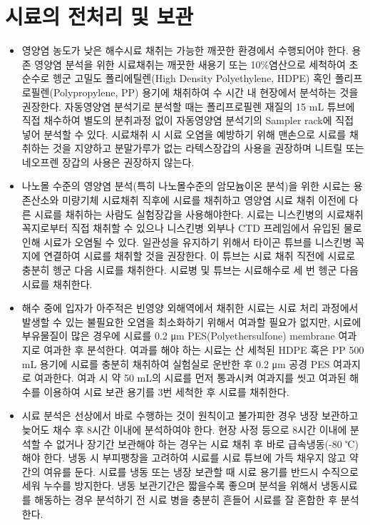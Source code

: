 \documentclass[
]{book}
\providecommand{\tightlist}{%
  \setlength{\itemsep}{0pt}\setlength{\parskip}{0pt}}
\begin{document}
\hypertarget{uxc2dcuxb8ccuxc758-uxc804uxcc98uxb9ac-uxbc0f-uxbcf4uxad00}{%
\section{시료의 전처리 및 보관}\label{uxc2dcuxb8ccuxc758-uxc804uxcc98uxb9ac-uxbc0f-uxbcf4uxad00}}

\begin{itemize}
\tightlist
\item
  영양염 농도가 낮은 해수시료 채취는 가능한 깨끗한 환경에서 수행되어야 한다. 용존 영양염 분석을 위한 시료채취는 깨끗한 새용기 또는 10\%염산으로 세척하여 초순수로 헹군 고밀도 폴리에틸렌(High Density Polyethylene, HDPE) 혹인 폴리프로필렌(Polypropylene, PP) 용기에 채취하여 수 시간 내 현장에서 분석하는 것을 권장한다. 자동영양염 분석기로 분석할 때는 폴리프로필렌 재질의 15 mL 튜브에 직접 채수하여 별도의 분취과정 없이 자동영양염 분석기의 Sampler rack에 직접 넣어 분석할 수 있다. 시료채취 시 시료 오염을 예방하기 위해 맨손으로 시료를 채취하는 것을 지양하고 분말가루가 없는 라텍스장갑의 사용을 권장하며 니트릴 또는 네오프렌 장갑의 사용은 권장하지 않는다.
\item
  나노몰 수준의 영양염 분석(특히 나노몰수준의 암모늄이온 분석)을 위한 시료는 용존산소와 미량기체 시료채취 직후에 시료를 채취하고 영양염 시료 채취 이전에 다른 시료를 채취하는 사람도 실험장갑을 사용해야한다. 시료는 니스킨병의 시료채취 꼭지로부터 직접 채취할 수 있으나 니스킨병 외부나 CTD 프레임에서 유입된 물로 인해 시료가 오염될 수 있다. 일관성을 유지하기 위해서 타이곤 튜브를 니스킨병 꼭지에 연결하여 시료를 채취할 것을 권장한다. 이 튜브는 시료 채취 직전에 시료로 충분히 헹군 다음 시료를 채취한다. 시료병 및 튜브는 시료해수로 세 번 헹군 다음 시료를 채취한다.
\item
  해수 중에 입자가 아주적은 빈영양 외해역에서 채취한 시료는 시료 처리 과정에서 발생할 수 있는 불필요한 오염을 최소화하기 위해서 여과할 필요가 없지만, 시료에 부유물질이 많은 경우에 시료를 0.2 μm PES(Polyethersulfone) membrane 여과지로 여과한 후 분석한다. 여과를 해야 하는 시료는 산 세척된 HDPE 혹은 PP 500 mL 용기에 시료를 충분히 채취하여 실험실로 운반한 후 0.2 μm 공경 PES 여과지로 여과한다. 여과 시 약 50 mL의 시료를 먼저 통과시켜 여과지를 씻고 여과된 해수를 이용하여 시료 보관 용기를 3번 세척한 후 시료를 채취한다.
\item
  시료 분석은 선상에서 바로 수행하는 것이 원칙이고 불가피한 경우 냉장 보관하고 늦어도 채수 후 8시간 이내에 분석하여야 한다. 현장 사정 등으로 8시간 이내에 분석할 수 없거나 장기간 보관해야 하는 경우는 시료 채취 후 바로 급속냉동(-80 ℃)해야 한다. 냉동 시 부피팽창을 고려하여 시료를 시료 튜브에 가득 채우지 않고 약간의 여유를 둔다. 시료를 냉동 또는 냉장 보관할 때 시료 용기를 반드시 수직으로 세워 누수를 방지한다. 냉동 보관기간은 짧을수록 좋으며 분석을 위해서 냉동시료를 해동하는 경우 분석하기 전 시료 병을 충분히 흔들어 시료를 잘 혼합한 후 분석한다.
\end{itemize}
\end{document}
